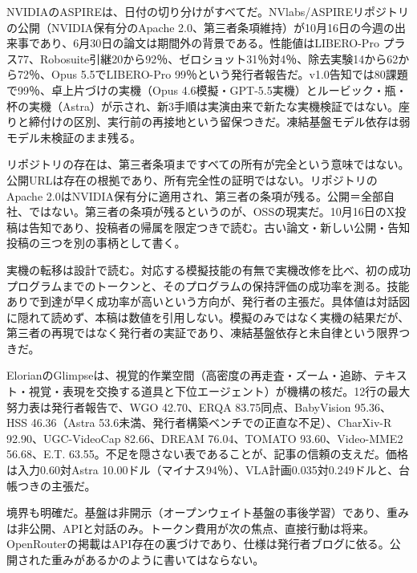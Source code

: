 \documentclass[lualatex,a4paper,10pt]{jlreq}
\begin{document}



NVIDIAのASPIREは、日付の切り分けがすべてだ。NVlabs/ASPIREリポジトリの公開（NVIDIA保有分のApache 2.0、第三者条項維持）が10月16日の今週の出来事であり、6月30日の論文は期間外の背景である。性能値はLIBERO-Pro プラス77、Robosuite引継20から92％、ゼロショット31％対4％、除去実験14から62から72％、Opus 5.5でLIBERO-Pro 99％という発行者報告だ。v1.0告知では80課題で99％、卓上片づけの実機（Opus 4.6模擬・GPT-5.5実機）とルービック・瓶・杯の実機（Astra）が示され、新3手順は実演由来で新たな実機検証ではない。座りと締付けの区別、実行前の再接地という留保つきだ。凍結基盤モデル依存は弱モデル未検証のまま残る。
\cite{B57,B56,B89}


リポジトリの存在は、第三者条項まですべての所有が完全という意味ではない。公開URLは存在の根拠であり、所有完全性の証明ではない。リポジトリのApache 2.0はNVIDIA保有分に適用され、第三者の条項が残る。公開＝全部自社、ではない。第三者の条項が残るというのが、OSSの現実だ。10月16日のX投稿は告知であり、投稿者の帰属を限定つきで読む。古い論文・新しい公開・告知投稿の三つを別の事柄として書く。
\cite{B57,B56}


実機の転移は設計で読む。対応する模擬技能の有無で実機改修を比べ、初の成功プログラムまでのトークンと、そのプログラムの保持評価の成功率を測る。技能ありで到達が早く成功率が高いという方向が、発行者の主張だ。具体値は対話図に隠れて読めず、本稿は数値を引用しない。模擬のみではなく実機の結果だが、第三者の再現ではなく発行者の実証であり、凍結基盤依存と未自律という限界つきだ。
\cite{B57,B56,B89}


ElorianのGlimpseは、視覚的作業空間（高密度の再走査・ズーム・追跡、テキスト・視覚・表現を交換する道具と下位エージェント）が機構の核だ。12行の最大努力表は発行者報告で、WGO 42.70、ERQA 83.75同点、BabyVision 95.36、HSS 46.36（Astra 53.6未満、発行者構築ベンチでの正直な不足）、CharXiv-R 92.90、UGC-VideoCap 82.66、DREAM 76.04、TOMATO 93.60、Video-MME2 56.68、E.T. 63.55。不足を隠さない表であることが、記事の信頼の支えだ。価格は入力0.60対Astra 10.00ドル（マイナス94％）、VLA計画0.035対0.249ドルと、台帳つきの主張だ。
\cite{B58,B59,B88}


境界も明確だ。基盤は非開示（オープンウェイト基盤の事後学習）であり、重みは非公開、APIと対話のみ。トークン費用が次の焦点、直接行動は将来。OpenRouterの掲載はAPI存在の裏づけであり、仕様は発行者ブログに依る。公開された重みがあるかのように書いてはならない。
\cite{B58,B59,B88}
\end{document}
